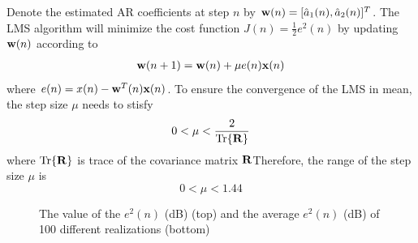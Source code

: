 \documentclass[10pt]{article}
\begin{document}
Denote the estimated AR coefficients at step $n$ by ${\bf{w}}(n) = [\hat{a}_1(n), \hat{a}_2(n)]^T$.
The LMS algorithm will minimize the cost function $J(n)=\frac{1}{2} e^2(n)$ by updating ${\bf{w}}(n)$
according to
\begin{eqnarray}
	{\bf{w}}(n+1) = {\bf{w}}(n) + \mu e(n) {\bf{x}}(n) \label{eq26}  
\end{eqnarray}
where $e(n) = x(n) - {\bf{w}}^T(n){\bf{x}}(n)$. To ensure the convergence of the LMS in mean, 
the step size $\mu$ needs to stisfy 
\begin{equation}
	0 < \mu < \frac{2}{\text{Tr}\{{\bf{R}}\}} \label{eq27}
\end{equation}
where $\text{Tr}\{{\bf{R}}\}$ is trace of the covariance matrix ${\bf{R}}$Therefore, the range of the step size $\mu$ is
\begin{equation}
	0 < \mu < 1.44 \label{eq28}
\end{equation}


\begin{figure}[htbp]
    \centering
    \caption{The value of the $e^2(n)$ (dB) (top) and the average $e^2(n)$ (dB) of 100 different realizations (bottom)}
    \label{fig12}
\end{figure}
\end{document}
